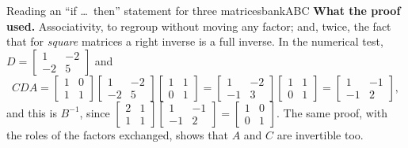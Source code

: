 \documentclass[11pt]{article}
\begin{document}
\begin{exmp}{Reading an ``if \dots\ then'' statement for three matrices}{bankABC}
\textbf{What the proof used.} Associativity, to regroup without moving any factor; and, twice, the fact that for \emph{square} matrices a right inverse is a full inverse. In the numerical test, $D=\begin{bmatrix}1&-2\\-2&5\end{bmatrix}$ and
\[
CDA=\begin{bmatrix}1&0\\1&1\end{bmatrix}\begin{bmatrix}1&-2\\-2&5\end{bmatrix}\begin{bmatrix}1&1\\0&1\end{bmatrix}=\begin{bmatrix}1&-2\\-1&3\end{bmatrix}\begin{bmatrix}1&1\\0&1\end{bmatrix}=\begin{bmatrix}1&-1\\-1&2\end{bmatrix},
\]
and this is $B^{-1}$, since $\begin{bmatrix}2&1\\1&1\end{bmatrix}\begin{bmatrix}1&-1\\-1&2\end{bmatrix}=\begin{bmatrix}1&0\\0&1\end{bmatrix}$. The same proof, with the roles of the factors exchanged, shows that $A$ and $C$ are invertible too.
\end{exmp}
\end{document}
